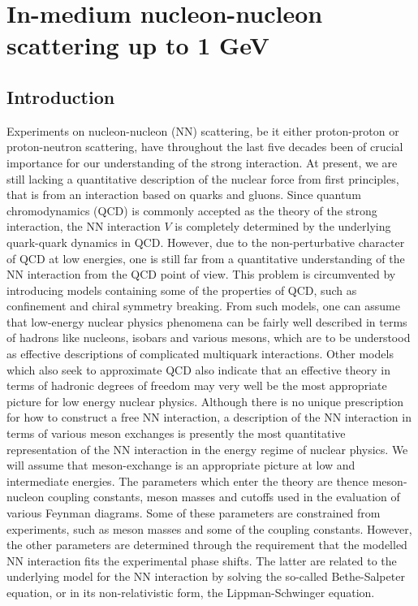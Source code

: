 


\pagestyle{plain}

\section*{In-medium nucleon-nucleon scattering up to 1 GeV}

\subsection*{Introduction}
Experiments on
nucleon-nucleon (NN) 
scattering, be it either proton-proton or proton-neutron scattering, 
have throughout the last five decades been
of crucial importance for our understanding of the strong interaction.
At present, we are still lacking a quantitative description
of the nuclear force from first principles, that is from an interaction
based on quarks and gluons.  
Since quantum chromodynamics (QCD) is commonly
accepted as the theory of the strong interaction, the
NN interaction $V$ is completely determined by the underlying
quark-quark dynamics in QCD. However, due to the non-perturbative
character of QCD at low energies, one is still far from a
quantitative understanding of the NN interaction from the QCD point of
view. This problem is circumvented by introducing
models containing some of the properties of QCD, such as
confinement and chiral symmetry breaking. 
From  such models, one can assume that
low-energy nuclear physics phenomena can be fairly well described
in terms of hadrons like nucleons, isobars and various mesons,
which are to be understood as effective descriptions of complicated
multiquark interactions.
Other models which
also seek to approximate QCD also indicate that an effective theory in terms
of hadronic degrees of freedom may very well be the most appropriate
picture for low energy nuclear physics.
Although there is no unique prescription for how to construct
a free NN interaction, a description
of the NN interaction in terms of various meson exchanges is presently
the most quantitative representation of the NN interaction
in the energy regime of nuclear physics.
We will assume that meson-exchange is an appropriate picture at low
and intermediate energies.  The parameters which enter the theory
are thence meson-nucleon coupling constants, meson masses and cutoffs
used in the evaluation of various Feynman diagrams. Some of these
parameters are constrained from experiments, such as meson masses
and some of the coupling constants. However, the other parameters
are determined through the requirement that the modelled NN interaction
fits the 
experimental phase shifts.
The latter are related to the underlying model for the NN interaction
by solving the so-called Bethe-Salpeter equation, or in its
non-relativistic form, the Lippman-Schwinger equation.

